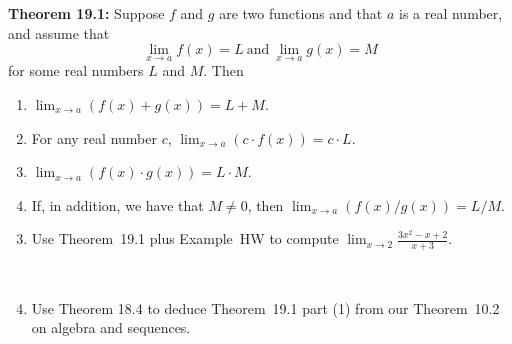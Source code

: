 \documentclass[12pt]{amsart}
\newcommand{\ds}{\displaystyle}
\begin{document}
\begin{framed}
\noindent \textbf{Theorem 19.1:} Suppose $f$ and $g$ are two functions and that $a$ is a real number, and
	assume  that 
	$$
	\lim_{x \to a} f(x) = L  \ \text{and} \  \lim_{x \to a} g(x) = M
	$$
	for some real numbers $L$ and $M$. Then
	\begin{enumerate}
		\item $\lim_{x \to a} (f(x) + g(x)) = L  + M$.
		\item For any real number $c$, $\lim_{x \to a} (c \cdot f(x)) = c \cdot L$.
		\item $\lim_{x \to a} (f(x) \cdot g(x)) = L \cdot M$.
		\item If, in addition, we have that $M \ne 0$,
		then $\lim_{x \to a} (f(x)/g(x)) = L/M$.
	\end{enumerate}
\end{framed}

\begin{enumerate} \setcounter{enumi}{2}

\item Use Theorem~19.1 plus Example~HW to compute $\ds \lim_{x\to 2} \frac{3x^2 - x +2}{x+3}$.

\

\item Use Theorem 18.4 to deduce Theorem~19.1 part (1) from our Theorem~10.2 on algebra and sequences.

\end{enumerate}
\end{document}

